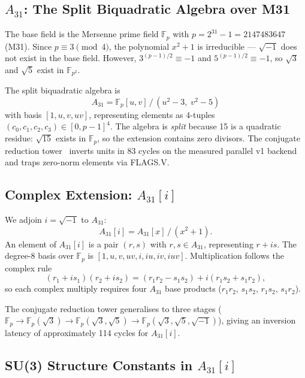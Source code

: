 \documentclass[conference]{IEEEtran}
\begin{document}
\subsection{$A_{31}$: The Split Biquadratic Algebra over M31}

The base field is the Mersenne prime field $\mathbb{F}_p$ with
$p = 2^{31}-1 = 2147483647$ (M31). Since $p \equiv 3 \pmod 4$, the
polynomial $x^2+1$ is irreducible --- $\sqrt{-1}$ does not exist in the
base field. However, $3^{(p-1)/2} \equiv -1$ and $5^{(p-1)/2} \equiv -1$,
so $\sqrt{3}$ and $\sqrt{5}$ exist in $\mathbb{F}_{p^2}$.

The split biquadratic algebra is
\begin{equation}
A_{31} = \mathbb{F}_p[u,v]\,/\,(u^2-3,\; v^2-5)
\end{equation}
with basis $[1, u, v, uv]$, representing elements as 4-tuples
$(c_0, c_1, c_2, c_3) \in [0, p-1]^4$. The algebra is \emph{split} because
15 is a quadratic residue: $\sqrt{15}$ exists in $\mathbb{F}_p$, so the
extension contains zero divisors. The conjugate reduction
tower~\cite{rplu2026} inverts units in 83 cycles on the measured parallel v1
backend and traps
zero-norm elements via FLAGS.V.

\subsection{Complex Extension: $A_{31}[i]$}

We adjoin $i = \sqrt{-1}$ to $A_{31}$:
\begin{equation}
A_{31}[i] = A_{31}[x]\,/\,(x^2+1).
\end{equation}
An element of $A_{31}[i]$ is a pair $(r, s)$ with $r, s \in A_{31}$,
representing $r + is$. The degree-8 basis over $\mathbb{F}_p$ is
$[1, u, v, uv, i, iu, iv, iuv]$. Multiplication follows the complex rule
\begin{equation}
(r_1 + is_1)(r_2 + is_2) = (r_1 r_2 - s_1 s_2) + i(r_1 s_2 + s_1 r_2),
\end{equation}
so each complex multiply requires four $A_{31}$ base products
($r_1r_2$, $s_1s_2$, $r_1s_2$, $s_1r_2$).

The conjugate reduction tower generalises to three stages
($\mathbb{F}_p \to \mathbb{F}_p(\sqrt{3}) \to \mathbb{F}_p(\sqrt{3},\sqrt{5})
\to \mathbb{F}_p(\sqrt{3},\sqrt{5},\sqrt{-1})$), giving an inversion latency
of approximately 114 cycles for $A_{31}[i]$.

\subsection{SU(3) Structure Constants in $A_{31}[i]$}
\end{document}
